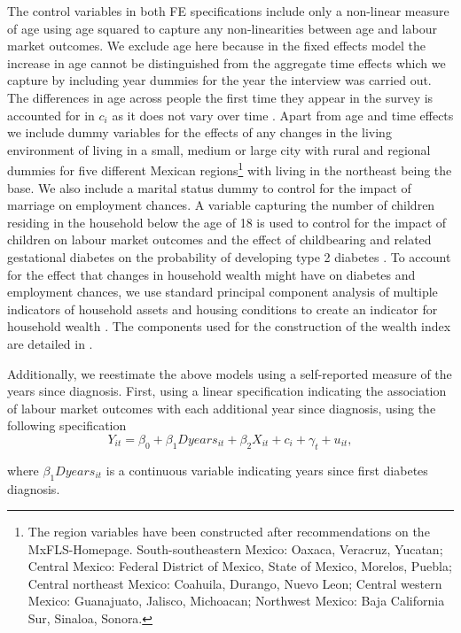 The control variables in both \ac{FE} specifications include only a non-linear measure of age using age squared
to capture any non-linearities between age and labour market outcomes. We exclude age here because in the fixed effects model the increase in age cannot be distinguished from the aggregate time effects which we capture by including year dummies for the year the interview was carried out. The differences in age across people the first time they appear in the survey is accounted for in $c_{i}$ as it does not vary over time \cite{Wooldridge2002a}. Apart from age and time effects we include dummy variables for the effects of any changes in the living environment
of living in a small, medium or large city with rural and regional
dummies for five different Mexican regions\footnote{The region variables have been constructed after recommendations on
the MxFLS-Homepage. South-southeastern Mexico: Oaxaca, Veracruz, Yucatan;
Central Mexico: Federal District of Mexico, State of Mexico, Morelos,
Puebla; Central northeast Mexico: Coahuila, Durango, Nuevo Leon; Central
western Mexico: Guanajuato, Jalisco, Michoacan; Northwest Mexico:
Baja California Sur, Sinaloa, Sonora.} with living in the northeast being the base. We also include a marital
status dummy to control for the impact of marriage on employment chances.
A variable capturing the number of children residing in the household
below the age of 18 is used to control for the impact of children
on labour market outcomes and the effect of childbearing and related
gestational diabetes on the probability of developing type 2 diabetes
\citep{Bellamy2009}. To account for the effect that changes in household
wealth might have on diabetes and employment chances, we use standard
principal component analysis of multiple indicators of household assets
and housing conditions to create an indicator for household wealth
\citep{Filmer2001}. The components used for the construction of the
wealth index are detailed in \citet{Seuring2015}.

Additionally, we reestimate the above models using a self-reported
measure of the years since diagnosis. First, using a linear specification
indicating the association of labour market  outcomes with each additional
year since diagnosis, using the following specification 
\begin{equation}
Y_{it}=\beta_{0}+\beta_{1}Dyears_{it}+\beta_{2}X_{it}+c_{i}+\gamma_{t}+u_{it},\label{eq:duration_linear}
\end{equation}


\noindent where $\beta_{1}Dyears_{it}$ is a continuous variable indicating
years since first diabetes diagnosis.

